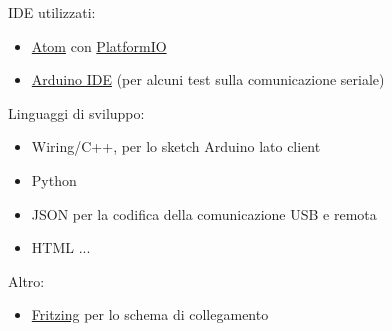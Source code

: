IDE utilizzati: 
\begin{itemize}
	\item \href{https://atom.io/}{Atom} con \href{ http://platformio.org/}{PlatformIO} 
	\item \href{https://www.arduino.cc/en/Main/Software}{Arduino IDE} (per alcuni test sulla comunicazione seriale) 
\end{itemize}

Linguaggi di sviluppo:
\begin{itemize}
	\item Wiring/C++, per lo sketch Arduino lato client 
	\item Python
	\item JSON per la codifica della comunicazione USB e remota
	\item HTML ...
\end{itemize}

Altro:
\begin{itemize}
	\item \href{http://fritzing.org}{Fritzing} per lo schema di collegamento
\end{itemize}